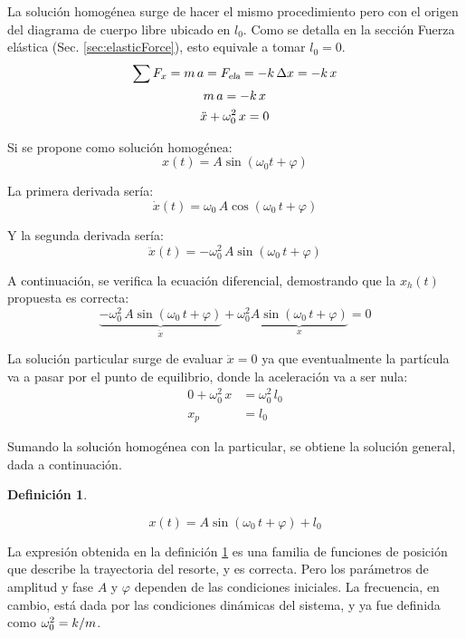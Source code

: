\documentclass[a5paper,12pt,twoside]{book}
\newtheorem{defn}{{Definición}}[chapter]
\begin{document}
La solución homogénea surge de hacer el mismo procedimiento pero con el origen del diagrama de cuerpo libre ubicado en $l_0$. Como se detalla en la sección Fuerza elástica (Sec. \ref{sec:elasticForce}), esto equivale a tomar $l_0 = 0$.
\begin{gather*}
    \sum F_x = m \, a = {{F}_\textsl{{ela}}} = - k \, \Delta x = -k \, x
    \\
    m \, a = - k \, x
    \\
    \ddot{x} + \omega_0^2 \, x = 0
\end{gather*}

Si se propone como solución homogénea:
\[ x(t) = A \sin{(\omega_0 t + \varphi)} \]

La primera derivada sería:
\[ \dot{x}(t) = \omega_0 \, A \cos{(\omega_0 \, t + \varphi)} \]

Y la segunda derivada sería:
\[ \ddot{x}(t) = - \omega_0^2 \, A \sin{(\omega_0 \, t + \varphi)} \]

A continuación, se verifica la ecuación diferencial, demostrando que la $x_h(t)$ propuesta es correcta:
\[
    \underbrace{- \omega_0^2 \, A \sin{(\omega_0 \, t + \varphi)}}_{\ddot{x}} + \omega_0^2 \underbrace{A \sin{(\omega_0 \, t + \varphi)}}_{x} = 0
\]

La solución particular surge de evaluar $\ddot{x} = 0$ ya que eventualmente la partícula va a pasar por el punto de equilibrio, donde la aceleración va a ser nula:
\begin{align*}
    0 + \omega_0^2 \, x &= \omega_0^2 \, l_0 
    \\
    x_p &= l_0
\end{align*}

Sumando la solución homogénea con la particular, se obtiene la solución general, dada a continuación.

\begin{mdframed}[style=MyFrame1]
    \begin{defn}
        \label{defn:solMAShorizontal}
    \end{defn}
    \begin{equation*}
        x(t) = A \sin{(\omega_0 \, t + \varphi)} + l_0
    \end{equation*}
\end{mdframed}

La expresión obtenida en la definición \ref{defn:solMAShorizontal} es una familia de funciones de posición que describe la trayectoria del resorte, y es correcta. Pero los parámetros de amplitud y fase $A$ y $\varphi$ dependen de las condiciones iniciales. La frecuencia, en cambio, está dada por las condiciones dinámicas del sistema, y ya fue definida como $\omega_0^2 = k/m$.
\end{document}
